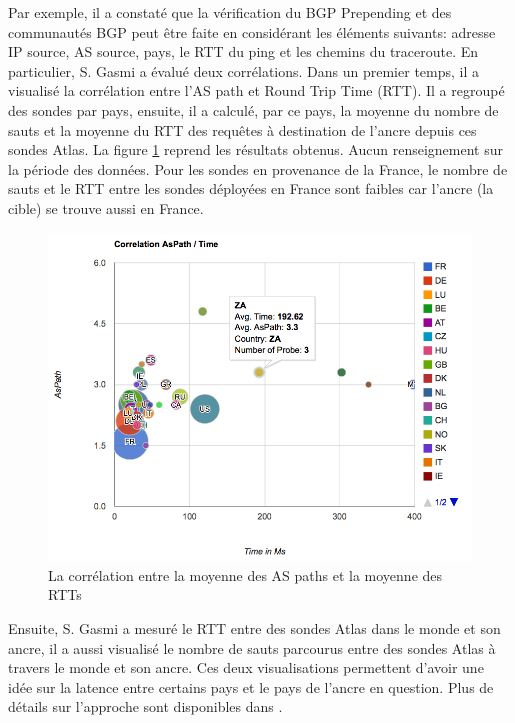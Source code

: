 Par exemple, il a constaté que la vérification du BGP Prepending et des communautés BGP peut être faite en  considérant les éléments suivants: adresse IP source, AS source, pays, le RTT du ping et les chemins du traceroute. En particulier, S. Gasmi a évalué deux corrélations. Dans un premier temps, il a visualisé la corrélation entre l'AS path et Round Trip Time (RTT). Il a regroupé des sondes par pays, ensuite, il a calculé, par ce pays, la moyenne du nombre de sauts et la moyenne du RTT des requêtes à destination de l'ancre depuis ces sondes Atlas.
La figure \ref{fig:1-AS-Path-Time-correlationv} reprend les résultats obtenus. Aucun renseignement sur la période des données. Pour les sondes en provenance de la France,  le nombre de sauts et le RTT entre les sondes déployées en France sont faibles car l'ancre (la cible) se trouve aussi en France.
\begin{figure}[H]
	\centering
	\captionsetup{justification=centering}
	\includegraphics[width=1\linewidth]{illustrations/1-AS-Path-Time-correlation}
	\caption{La corrélation entre la moyenne des AS paths et la moyenne des RTTs \cite{Salim-Gasmi}}
	\label{fig:1-AS-Path-Time-correlationv}
\end{figure}


Ensuite, S. Gasmi a mesuré le RTT entre des sondes Atlas dans le monde et son ancre, il a aussi visualisé le nombre de sauts parcourus entre des sondes Atlas à travers le monde et son ancre. Ces deux visualisations permettent d'avoir une idée sur la latence entre certains pays et le pays de l'ancre en question. Plus de détails sur l'approche sont disponibles dans \cite{Salim-Gasmi}.


